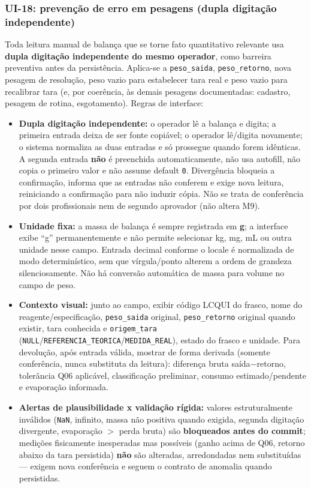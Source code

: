 \subsubsection{UI-18: prevenção de erro em pesagens (dupla digitação independente)}
Toda leitura manual de balança que se torne fato quantitativo relevante usa \textbf{dupla digitação independente do mesmo operador}, como barreira preventiva antes da persistência. Aplica-se a \texttt{peso\_saida}, \texttt{peso\_retorno}, nova pesagem de resolução, peso vazio para estabelecer tara real e peso vazio para recalibrar tara (e, por coerência, às demais pesagens documentadas: cadastro, pesagem de rotina, esgotamento). Regras de interface:
\begin{itemize}
    \item \textbf{Dupla digitação independente:} o operador lê a balança e digita; a primeira entrada deixa de ser fonte copiável; o operador lê/digita novamente; o sistema normaliza as duas entradas e só prossegue quando forem idênticas. A segunda entrada \textbf{não} é preenchida automaticamente, não usa autofill, não copia o primeiro valor e não assume default \texttt{0}. Divergência bloqueia a confirmação, informa que as entradas não conferem e exige nova leitura, reiniciando a confirmação para não induzir cópia. Não se trata de conferência por dois profissionais nem de segundo aprovador (não altera M9).
    \item \textbf{Unidade fixa:} a massa de balança é sempre registrada em \textbf{g}; a interface exibe ``g'' permanentemente e não permite selecionar kg, mg, mL ou outra unidade nesse campo. Entrada decimal conforme o locale é normalizada de modo determinístico, sem que vírgula/ponto alterem a ordem de grandeza silenciosamente. Não há conversão automática de massa para volume no campo de peso.
    \item \textbf{Contexto visual:} junto ao campo, exibir código LCQUI do frasco, nome do reagente/especificação, \texttt{peso\_saida} original, \texttt{peso\_retorno} original quando existir, tara conhecida e \texttt{origem\_tara} (\texttt{NULL}/\texttt{REFERENCIA\_TEORICA}/\texttt{MEDIDA\_REAL}), estado do frasco e unidade. Para devolução, após entrada válida, mostrar de forma derivada (somente conferência, nunca substituta da leitura): diferença bruta saída$-$retorno, tolerância Q06 aplicável, classificação preliminar, consumo estimado/pendente e evaporação informada.
    \item \textbf{Alertas de plausibilidade x validação rígida:} valores estruturalmente inválidos (\texttt{NaN}, infinito, massa não positiva quando exigida, segunda digitação divergente, evaporação $>$ perda bruta) são \textbf{bloqueados antes do commit}; medições fisicamente inesperadas mas possíveis (ganho acima de Q06, retorno abaixo da tara persistida) \textbf{não} são alteradas, arredondadas nem substituídas — exigem nova conferência e seguem o contrato de anomalia quando persistidas.

\end{itemize}
